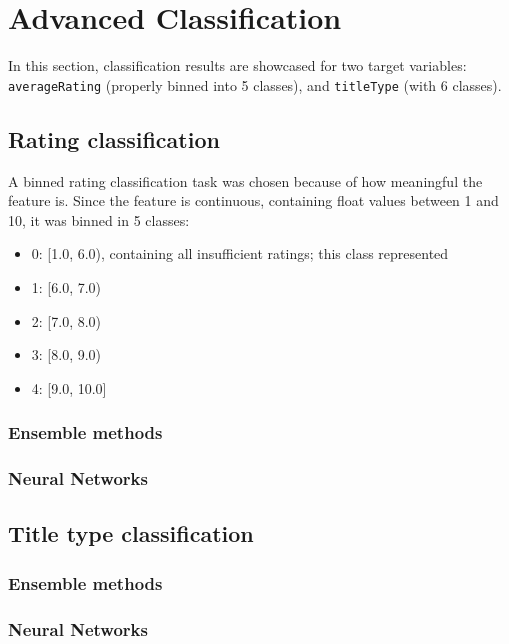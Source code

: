 \section{Advanced Classification}

In this section, classification results are showcased for two
target variables: \texttt{averageRating} (properly binned into
5 classes), and \texttt{titleType} (with 6 classes).


\subsection{Rating classification}
A binned rating classification task was chosen because of how meaningful
the feature is.
Since the feature is continuous, containing float values between 1 and 10,
it was binned in 5 classes:

\begin{itemize}
    \item 0: [1.0, 6.0), containing all insufficient ratings; this class
    represented 
    \item 1: [6.0, 7.0)
    \item 2: [7.0, 8.0)
    \item 3: [8.0, 9.0)
    \item 4: [9.0, 10.0]
\end{itemize}

\subsubsection{Ensemble methods}

\subsubsection{Neural Networks}

\subsection{Title type classification}

\subsubsection{Ensemble methods}

\subsubsection{Neural Networks}
